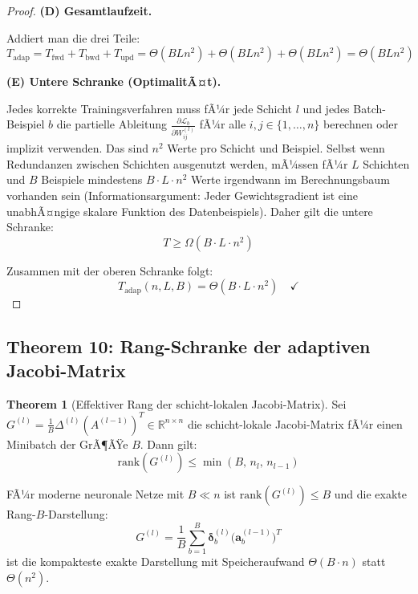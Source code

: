 ﻿\documentclass[a4paper,12pt]{article}
\theoremstyle{definition}
\newtheorem{theorem}{Theorem}
\begin{document}
\begin{proof}
	\medskip
	\textbf{(D) Gesamtlaufzeit.}
	
	Addiert man die drei Teile:
	\[
	T_{\mathrm{adap}} = T_{\mathrm{fwd}} + T_{\mathrm{bwd}} + T_{\mathrm{upd}} = \Theta(BLn^2) + \Theta(BLn^2) + \Theta(BLn^2) = \Theta(BLn^2)
	\]
	
	\medskip
	\textbf{(E) Untere Schranke (OptimalitÃ¤t).}
	
	Jedes korrekte Trainingsverfahren muss fÃ¼r jede Schicht $l$ und jedes Batch-Beispiel $b$ die partielle Ableitung $\frac{\partial \mathcal{L}_b}{\partial W^{(l)}_{ij}}$ fÃ¼r alle $i, j \in \{1, \ldots, n\}$ berechnen oder implizit verwenden. Das sind $n^2$ Werte pro Schicht und Beispiel. Selbst wenn Redundanzen zwischen Schichten ausgenutzt werden, mÃ¼ssen fÃ¼r $L$ Schichten und $B$ Beispiele mindestens $B \cdot L \cdot n^2$ Werte irgendwann im Berechnungsbaum vorhanden sein (Informationsargument: Jeder Gewichtsgradient ist eine unabhÃ¤ngige skalare Funktion des Datenbeispiels). Daher gilt die untere Schranke:
	\[
	T \geq \Omega(B \cdot L \cdot n^2)
	\]
	
	Zusammen mit der oberen Schranke folgt:
	\[
	T_{\mathrm{adap}}(n, L, B) = \Theta(B \cdot L \cdot n^2) \quad \checkmark
	\]
\end{proof}

\subsection{Theorem 10: Rang-Schranke der adaptiven Jacobi-Matrix}

\begin{theorem}[Effektiver Rang der schicht-lokalen Jacobi-Matrix]
	\label{thm:rank_bound}
	Sei $G^{(l)} = \frac{1}{B} \Delta^{(l)} (A^{(l-1)})^T \in \mathbb{R}^{n \times n}$ die schicht-lokale Jacobi-Matrix fÃ¼r einen Minibatch der GrÃ¶ÃŸe $B$. Dann gilt:
	\[
	\mathrm{rank}(G^{(l)}) \leq \min(B,\, n_l,\, n_{l-1})
	\]
	
	FÃ¼r moderne neuronale Netze mit $B \ll n$ ist $\mathrm{rank}(G^{(l)}) \leq B$ und die exakte Rang-$B$-Darstellung:
	\[
	G^{(l)} = \frac{1}{B} \sum_{b=1}^B \boldsymbol{\delta}^{(l)}_b \bigl(\boldsymbol{a}^{(l-1)}_b\bigr)^T
	\]
	ist die kompakteste exakte Darstellung mit Speicheraufwand $\Theta(B \cdot n)$ statt $\Theta(n^2)$.
\end{theorem}
\end{document}
